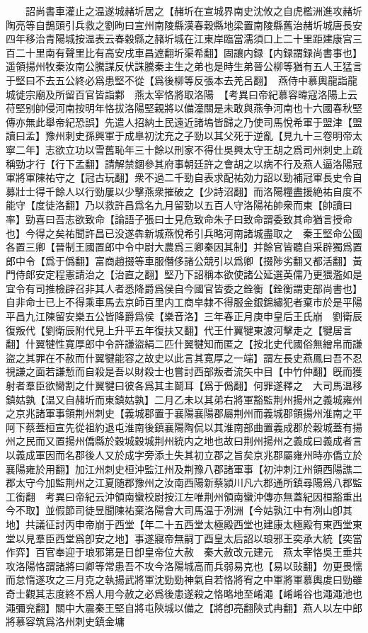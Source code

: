 　　詔尚書車灌止之温遂城赭圻居之【赭圻在宣城界南史沈攸之自虎檻洲進攻赭圻陶亮等自鵲頭引兵救之劉昫曰宣州南陵縣漢春穀縣地梁置南陵縣舊治赭圻城唐長安四年移治青陽城按温表云春穀縣之赭圻城在江東岸臨當濡須口上二十里距建康宫三百二十里南有聲里比有高安戌車昌遮翻圻渠希翻】固讓内録【内録謂録尚書事也】遥領揚州牧秦汝南公騰謀反伏誅騰秦主生之弟也是時生弟晉公柳等猶有五人王猛言于堅曰不去五公終必爲患堅不從【爲後柳等反張本去羌呂翻】　燕侍中慕輿龍詣龍城徙宗廟及所留百官皆詣鄴　燕太宰恪將取洛陽　【考異曰帝紀慕容暐寇洛陽上云苻堅别帥侵河南按明年恪拔洛陽堅親將以備潼關是未敢與燕争河南也十六國春秋堅傳亦無此舉帝紀恐誤】先遣人招納土民遠近諸塢皆歸之乃使司馬悅希軍于盟津【盟讀曰孟】豫州刺史孫興軍于成臯初沈充之子勁以其父死于逆亂【見九十三卷明帝太寧二年】志欲立功以雪舊恥年三十餘以刑家不得仕吳興太守王胡之爲司州刺史上疏稱勁才行【行下孟翻】請解禁錮參其府事朝廷許之會胡之以病不行及燕人逼洛陽冠軍將軍陳祐守之【冠古玩翻】衆不過二千勁自表求配祐効力詔以勁補冠軍長史令自募壯士得千餘人以行勁屢以少擊燕衆摧破之【少詩沼翻】而洛陽糧盡援絶祐自度不能守【度徒洛翻】乃以救許昌爲名九月留勁以五百人守洛陽祐帥衆而東【帥讀曰率】勁喜曰吾志欲致命【論語子張曰士見危致命朱子曰致命謂委致其命猶言授命也】今得之矣祐聞許昌已没遂犇新城燕悅希引兵略河南諸城盡取之　秦王堅命公國各置三卿【晉制王國置郎中令中尉大農爲三卿秦因其制】并餘官皆聽自采辟獨爲置郎中令【爲于僞翻】富商趙掇等車服僭侈諸公競引以爲卿【掇陟劣翻又都活翻】黃門侍郎安定程憲請治之【治直之翻】堅乃下詔稱本欲使諸公延選英儒乃更猥濫如是宜令有司推檢辟召非其人者悉降爵爲侯自今國官皆委之銓衡【銓衡謂吏部尚書也】自非命士已上不得乘車馬去京師百里内工商皁隸不得服金銀錦繡犯者棄市於是平陽平昌九江陳留安樂五公皆降爵爲侯【樂音洛】三年春正月庚申皇后王氏崩　劉衛辰復叛代【劉衛辰附代見上升平五年復扶又翻】代王什翼犍東渡河擊走之【犍居言翻】什翼犍性寛厚郎中令許謙盜絹二匹什翼犍知而匿之【按北史代國俗無繒帛而謙盜之其罪在不赦而什翼犍能容之故史以此言其寛厚之一端】謂左長史燕鳳曰吾不忍視謙之面若謙慙而自殺是吾以財殺士也嘗討西部叛者流矢中目【中竹仲翻】旣而獲射者羣臣欲臠割之什翼犍曰彼各爲其主鬬耳【爲于僞翻】何罪遂釋之　大司馬温移鎮姑孰【温又自赭圻而東鎮姑孰】二月乙未以其弟右將軍豁監荆州揚州之義城雍州之京兆諸軍事領荆州刺史【義城郡置于襄陽襄陽郡屬荆州而義城郡領揚州淮南之平阿下蔡蓋桓宣先從祖約退屯淮南後鎮襄陽陶侃以其淮南部曲置義成郡於穀城蓋有揚州之民而又置揚州僑縣於穀城穀城荆州統内之地也故曰荆州揚州之義成曰義成者言以義成軍因而名郡後人又於成字旁添土失其初立郡之旨矣京兆郡屬雍州時亦僑立於襄陽雍於用翻】加江州刺史桓沖監江州及荆豫八郡諸軍事【初沖刺江州領西陽譙二郡太守今加監荆州之江夏随郡豫州之汝南西陽新蔡潁川凡六郡通所鎮尋陽爲八郡監工銜翻　考異曰帝紀云沖領南蠻校尉按江左唯荆州領南蠻沖傳亦無蓋紀因桓豁重出今不取】並假節司徒昱聞陳祐棄洛陽會大司馬温于冽洲【今姑孰江中有冽山卽其地】共議征討丙申帝崩于西堂【年二十五西堂太極殿西堂也建康太極殿有東西堂東堂以見羣臣西堂爲卽安之地】事遂寢帝無嗣丁酉皇太后詔以琅邪王奕承大統【奕當作弈】百官奉迎于琅邪第是日卽皇帝位大赦　秦大赦改元建元　燕太宰恪吳王垂共攻洛陽恪謂諸將曰卿等常患吾不攻今洛陽城高而兵弱易克也【易以䜴翻】勿更畏懦而怠惰遂攻之三月克之執揚武將軍沈勁勁神氣自若恪將宥之中軍將軍慕輿䖍曰勁雖奇士觀其志度終不爲人用今赦之必爲後患遂殺之恪略地至崤澠【崤崤谷也澠澠池也澠彌兖翻】關中大震秦王堅自將屯陝城以備之【將卽亮翻陝式冉翻】燕人以左中郎將慕容筑爲洛州刺史鎮金墉